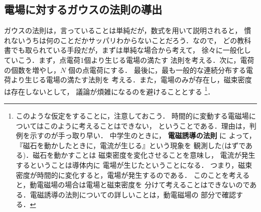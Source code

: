     \subsection{電場に対するガウスの法則の導出}
        \begin{mycomment}
            ガウスの法則は，言っていることは単純だが，数式を用いて説明されると，
            慣れないうちは何のことだかサッパリわからないことだろう．なので，
            どの教科書でも取られている手段だが，まずは単純な場合から考えて，
            徐々に一般化していこう．まず，点電荷1個より生じる電場の満たす
            法則を考える．次に，電荷の個数を増やし，$N$ 個の点電荷にする．
            最後に，最も一般的な連続分布する電荷より生じる電場の満たす法則を
            考える．また，電場のみが存在し，磁束密度は存在しないとして，
            議論が煩雑になるのを避けることとする
                \footnote{
                    このような仮定をすることに，注意しておこう．
                    時間的に変動する電磁場についてはこのように考えることはできない，
                    ということである．理由は，判例を示すのが手っ取り早い．
                    中学生のときに， \textbf{電磁誘導の法則} に
                    よって，『磁石を動かしたときに，電流が生じる』という現象を
                    観測した(はずである)．磁石を動かすことは
                    磁束密度を変化させることを意味し，
                    電流が発生するということは導体内に
                    電場が生じたということになる．
                    つまり，磁束密度が時間的に変化すると，電場が発生するのである．
                    このことを考えると，動電磁場の場合は電場と磁束密度を
                    分けて考えることはできないのである．電磁誘導の法則についての詳しいことは，動電磁場の
                    部分で確認する．
                }．
        \end{mycomment}
